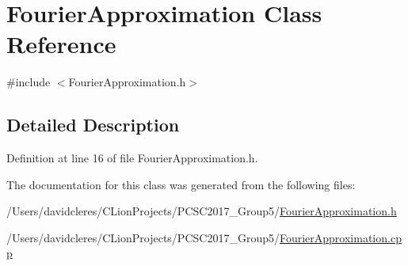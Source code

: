 \hypertarget{class_fourier_approximation}{}\section{Fourier\+Approximation Class Reference}
\label{class_fourier_approximation}


{\ttfamily \#include $<$Fourier\+Approximation.\+h$>$}



\subsection{Detailed Description}


Definition at line 16 of file Fourier\+Approximation.\+h.



The documentation for this class was generated from the following files\+:\begin{DoxyCompactItemize}
\item 
/\+Users/davidcleres/\+C\+Lion\+Projects/\+P\+C\+S\+C2017\+\_\+\+Group5/\mbox{\hyperlink{_fourier_approximation_8h}{Fourier\+Approximation.\+h}}\item 
/\+Users/davidcleres/\+C\+Lion\+Projects/\+P\+C\+S\+C2017\+\_\+\+Group5/\mbox{\hyperlink{_fourier_approximation_8cpp}{Fourier\+Approximation.\+cpp}}\end{DoxyCompactItemize}
